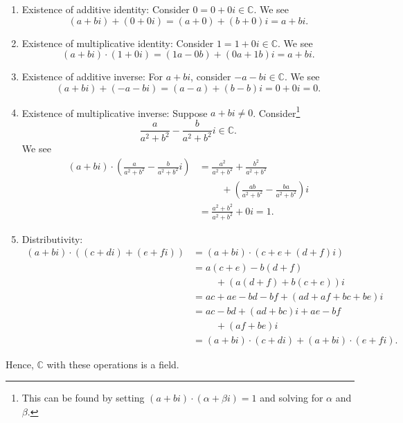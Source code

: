 \begin{sltn}[\ref{exer:cfield}]
\begin{enumerate}
    \item Existence of additive identity: Consider $ 0=0+0i\in\mathbb{C} $. We see
    \begin{equation*}
        (a+bi)+(0+0i)=(a+0)+(b+0)i=a+bi.
    \end{equation*}

    \item Existence of multiplicative identity: Consider $ 1=1+0i\in\mathbb{C} $. We see
    \begin{equation*}
        (a+bi)\cdot(1+0i)=(1a-0b)+(0a+1b)i=a+bi.
    \end{equation*}

    \item Existence of additive inverse: For $ a+bi $, consider $ -a-bi\in\mathbb{C} $. We see
    \begin{equation*}
        (a+bi)+(-a-bi)=(a-a)+(b-b)i=0+0i=0.
    \end{equation*}

    \item Existence of multiplicative inverse: Suppose $ a+bi\neq 0 $. Consider\footnote{This can be found by setting $ (a+bi)\cdot(\alpha+\beta i)=1 $ and solving for $ \alpha $ and $ \beta $.}
    \begin{equation*}
        \frac{a}{a^2+b^2}-\frac{b}{a^2+b^2}i\in\mathbb{C}.
    \end{equation*}
    We see
    \begin{align*}
        (a+bi)\cdot\left(\frac{a}{a^2+b^2}-\frac{b}{a^2+b^2}i\right) &= \frac{a^2}{a^2+b^2}+\frac{b^2}{a^2+b^2} \\
        &\phantom{=}\quad +\left(\frac{ab}{a^2+b^2}-\frac{ba}{a^2+b^2}\right)i \\
        &= \frac{a^2+b^2}{a^2+b^2}+0i=1.
    \end{align*}

    \item Distributivity:
    \begin{align*}
        (a+bi)\cdot((c+di)+(e+fi)) &= (a+bi)\cdot(c+e+(d+f)i) \\
        &= a(c+e)-b(d+f) \\
        &\phantom{=}\quad +(a(d+f)+b(c+e))i \\
        &= ac+ae-bd-bf+(ad+af+bc+be)i \\
        &= ac-bd+(ad+bc)i+ae-bf \\
        &\phantom{=}\quad +(af+be)i \\
        &= (a+bi)\cdot(c+di)+(a+bi)\cdot(e+fi).
    \end{align*}
\end{enumerate}
Hence, $ \mathbb{C} $ with these operations is a field.
\end{sltn}